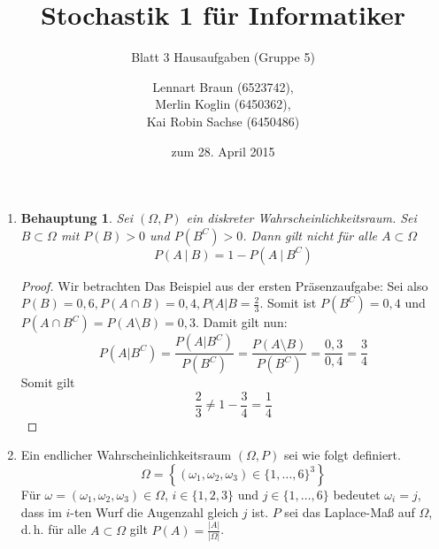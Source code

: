 \documentclass[a4paper]{scrartcl}
\title{Stochastik 1 für Informatiker}
\subtitle{Blatt 3 Hausaufgaben (Gruppe 5)}
\author{
    Lennart Braun (6523742), \\
    Merlin Koglin (6450362), \\
    Kai Robin Sachse (6450486)
}
\date{zum 28. April 2015}
\newtheorem*{behaupt}{Behauptung}
\begin{document}
\maketitle

\begin{enumerate}[label=\bfseries\arabic*.]
    \item
        \begin{behaupt}
            Sei $(\Omega, P)$ ein diskreter Wahrscheinlichkeitsraum.
            Sei $B \subset \Omega$ mit $P(B) > 0$ und $P(B^C) > 0$.
            Dann gilt nicht für alle $A \subset \Omega$
            \begin{equation*}
                P(A\ |\ B) = 1 - P(A\ |\ B^C)
            \end{equation*}
        \end{behaupt}
        \begin{proof}
            Wir betrachten Das Beispiel aus der ersten Präsenzaufgabe: Sei also $P(B)=0,6, P(A\cap B)=0,4, 
            P(A|B=\frac{2}{3}$. 
            Somit ist $P(B^C)=0,4$ und $P(A\cap B^C)=P(A\setminus B)=0,3$. Damit gilt nun:
            \[P(A|B^C)=\frac{P(A|B^C)}{P(B^C)}=\frac{P(A\setminus B)}{P(B^C)}=\frac{0,3}{0,4}=\frac{3}{4}\]
            Somit gilt 
            \[\frac{2}{3}\ne 1-\frac{3}{4}=\frac{1}{4}\]
        \end{proof}

    \item
        Ein endlicher Wahrscheinlichkeitsraum $(\Omega, P)$ sei wie folgt
        definiert.
        \begin{equation*}
            \Omega = \left\{ (\omega_1, \omega_2, \omega_3)
                \in \{1, \ldots, 6\}^3 \right\}
        \end{equation*}
        Für $\omega = (\omega_1, \omega_2, \omega_3) \in \Omega$,
        $i \in \{1, 2, 3\}$ und $j \in \{1, \ldots, 6\}$ bedeutet
        $\omega_i = j$, dass im $i$-ten Wurf die Augenzahl gleich $j$ ist.
        $P$ sei das Laplace-Maß auf $\Omega$, d.\,h. für alle $A \subset \Omega$
        gilt $P(A) = \frac{|A|}{|\Omega|}$.


\end{enumerate}
\end{document}
